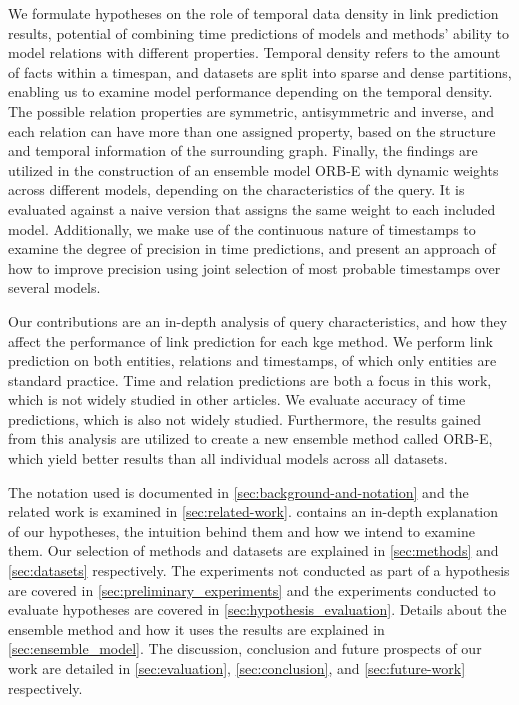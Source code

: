 We formulate hypotheses on the role of temporal data density in link prediction results, potential of combining time predictions of models and methods' ability to model relations with different properties.
Temporal density refers to the amount of facts within a timespan, and datasets are split into sparse and dense partitions, enabling us to examine model performance depending on the temporal density.
The possible relation properties are symmetric, antisymmetric and inverse, and each relation can have more than one assigned property, based on the structure and temporal information of the surrounding graph.
Finally, the findings are utilized in the construction of an ensemble model ORB-E with dynamic weights across different models, depending on the characteristics of the query.
It is evaluated against a naive version that assigns the same weight to each included model.
Additionally, we make use of the continuous nature of timestamps to examine the degree of precision in time predictions, and present an approach of how to improve precision using joint selection of most probable timestamps over several models.


Our contributions are an in-depth analysis of query characteristics, and how they affect the performance of link prediction for each \gls{kge} method.
We perform link prediction on both entities, relations and timestamps, of which only entities are standard practice.
Time and relation predictions are both a focus in this work, which is not widely studied in other articles.
We evaluate accuracy of time predictions, which is also not widely studied.
Furthermore, the results gained from this analysis are utilized to create a new ensemble method called ORB-E, which yield better results than all individual models across all datasets.

The notation used is documented in \autoref{sec:background-and-notation} and the related work is examined in \autoref{sec:related-work}.
 contains an in-depth explanation of our hypotheses, the intuition behind them and how we intend to examine them.
Our selection of methods and datasets are explained in \autoref{sec:methods} and \autoref{sec:datasets} respectively.
The experiments not conducted as part of a hypothesis are covered in \autoref{sec:preliminary_experiments} and the experiments conducted to evaluate hypotheses are covered in \autoref{sec:hypothesis_evaluation}.
Details about the ensemble method and how it uses the results are explained in \autoref{sec:ensemble_model}.
The discussion, conclusion and future prospects of our work are detailed in \autoref{sec:evaluation}, \autoref{sec:conclusion}, and \autoref{sec:future-work} respectively.